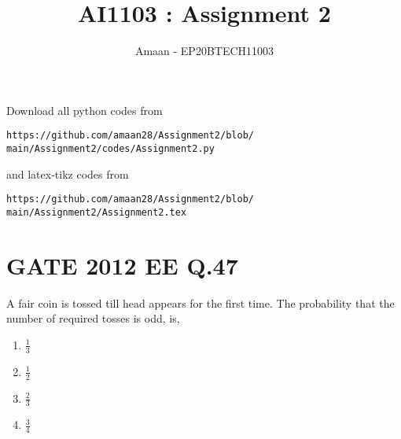 \documentclass[journal,12pt,twocolumn]{IEEEtran}
\begin{document}
\let\vec\mathbf
\renewcommand{\thefigure}{\theproblem}
\def\putbox#1#2#3{\makebox[0in][l]{\makebox[#1][l]{}\raisebox{\baselineskip}[0in][0in]{\raisebox{#2}[0in][0in]{#3}}}}
     \def\rightbox#1{\makebox[0in][r]{#1}}
     \def\centbox#1{\makebox[0in]{#1}}
     \def\topbox#1{\raisebox{-\baselineskip}[0in][0in]{#1}}
     \def\midbox#1{\raisebox{-0.5\baselineskip}[0in][0in]{#1}}
\vspace{3cm}
\title{AI1103 : Assignment 2}
\author{Amaan - EP20BTECH11003}
\maketitle
\newpage
\bigskip
\renewcommand{\thefigure}{\arabic{figure}}
\renewcommand{\thetable}{\arabic{table}}
Download all python codes from 
\begin{lstlisting}
https://github.com/amaan28/Assignment2/blob/
main/Assignment2/codes/Assignment2.py
\end{lstlisting}
%
and latex-tikz codes from 
%
\begin{lstlisting}
https://github.com/amaan28/Assignment2/blob/
main/Assignment2/Assignment2.tex
\end{lstlisting}
\section*{GATE 2012 EE Q.47}
A fair coin is tossed till head appears for the first time. The probability that the number of required tosses is odd, is, \\
\begin{enumerate}
    \item $\frac{1}{3}$
    \item $\frac{1}{2}$
    \item $\frac{2}{3}$
    \item $\frac{3}{4}$
\end{enumerate}
\end{document}
